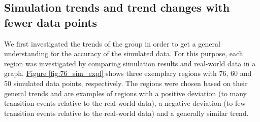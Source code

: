 \subsection{Simulation trends and trend changes with fewer data points}
We first investigated the trends of the  group in order to get a general understanding for the accuracy of the simulated
data. For this purpose, each region was investigated by comparing simulation results and real-world data in a graph.
\hyperref[fig:76_sim_expl]{Figure \ref*{fig:76_sim_expl}} shows three exemplary regions with 76, 60 and 50 simulated data
points, respectively. The regions were chosen based on their general trends and are examples of regions with a positive deviation
(to many transition events relative to the real-world data), a negative deviation (to few transition events relative to the real-world data) and a generally similar trend.\newline

